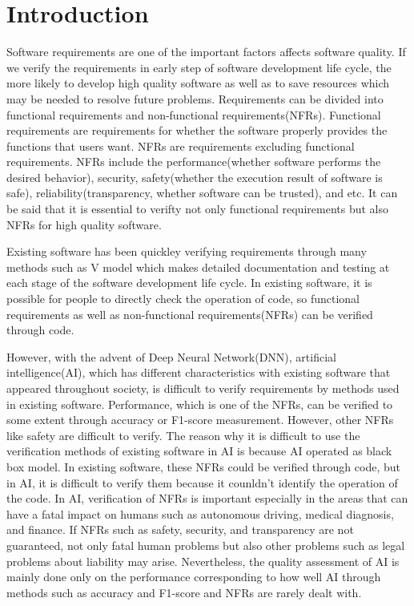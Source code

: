 \documentclass[journal,article,submit,moreauthors,pdftex]{Definitions/mdpi}
\begin{document}
\setcounter{section}

\section{Introduction}

Software requirements are one of the important factors affects software quality.
If we verify the requirements in early step of software development life cycle, the more likely to develop high quality software as well as to save resources which may be needed to resolve future problems.
Requirements can be divided into functional requirements and non-functional requirements(NFRs).
Functional requirements are requirements for whether the software properly provides the functions that users want.
NFRs are requirements excluding functional requirements. NFRs include the performance(whether software performs the desired behavior), security, safety(whether the execution result of software is safe), reliability(transparency, whether software can be trusted), and etc. %
It can be said that it is essential to verifty not only functional requirements but also NFRs for high quality software.

Existing software has been quickley verifying requirements through many methods such as V model which makes detailed documentation and testing at each stage of the software development life cycle.
In existing software, it is possible for people to directly check the operation of code, so functional requirements as well as non-functional requirements(NFRs) can be verified through code.\

However, with the advent of Deep Neural Network(DNN), artificial intelligence(AI), which has different characteristics with existing software that appeared throughout society, is difficult to verify requirements by methods used in existing software.
Performance, which is one of the NFRs, can be verified to some extent through accuracy or F1-score measurement. However, other NFRs like safety are difficult to verify.
The reason why it is difficult to use the verification methods of existing software in AI is because AI operated as black box model. In existing software, these NFRs could be verified through code, but in AI, it is difficult to verify them because it counldn't identify the operation of the code.
In AI, verification of NFRs is important especially in the areas that can have a fatal impact on humans such as autonomous driving, medical diagnosis, and finance.
If NFRs such as safety, security, and transparency are not guaranteed, not only fatal human problems but also other problems such as legal problems about liability may arise.
Nevertheless, the quality assessment of AI is mainly done only on the performance corresponding to how well AI through methods such as accuracy and F1-score and NFRs are rarely dealt with.
\end{document}
